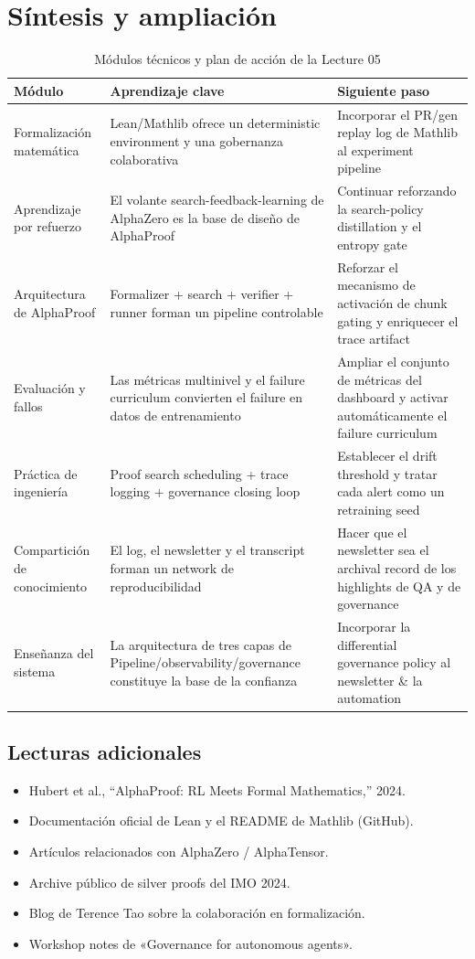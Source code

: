 \documentclass[a4paper]{article}
\begin{document}
\section{Síntesis y ampliación}
\begin{table}[H]
\centering
\begin{tabular}{p{4cm}p{6cm}p{5cm}}
\toprule
Módulo & Aprendizaje clave & Siguiente paso \\
\midrule
Formalización matemática & Lean/Mathlib ofrece un deterministic environment y una gobernanza colaborativa & Incorporar el PR/gen replay log de Mathlib al experiment pipeline \\
Aprendizaje por refuerzo & El volante search-feedback-learning de AlphaZero es la base de diseño de AlphaProof & Continuar reforzando la search-policy distillation y el entropy gate \\
Arquitectura de AlphaProof & Formalizer + search + verifier + runner forman un pipeline controlable & Reforzar el mecanismo de activación de chunk gating y enriquecer el trace artifact \\
Evaluación y fallos & Las métricas multinivel y el failure curriculum convierten el failure en datos de entrenamiento & Ampliar el conjunto de métricas del dashboard y activar automáticamente el failure curriculum \\
Práctica de ingeniería & Proof search scheduling + trace logging + governance closing loop & Establecer el drift threshold y tratar cada alert como un retraining seed \\
Compartición de conocimiento & El log, el newsletter y el transcript forman un network de reproducibilidad & Hacer que el newsletter sea el archival record de los highlights de QA y de governance \\
Enseñanza del sistema & La arquitectura de tres capas de Pipeline/observability/governance constituye la base de la confianza & Incorporar la differential governance policy al newsletter \& la automation \\
\bottomrule
\end{tabular}
\caption{Módulos técnicos y plan de acción de la Lecture 05}
\end{table}

\subsection{Lecturas adicionales}
\begin{itemize}
    \item Hubert et al., ``AlphaProof: RL Meets Formal Mathematics,'' 2024.
    \item Documentación oficial de Lean y el README de Mathlib (GitHub).
    \item Artículos relacionados con AlphaZero / AlphaTensor.
    \item Archive público de silver proofs del IMO 2024.
    \item Blog de Terence Tao sobre la colaboración en formalización.
    \item Workshop notes de «Governance for autonomous agents».
\end{itemize}
\end{document}
